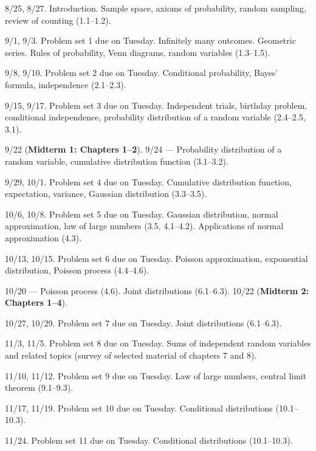 \documentclass[oneside,11pt]{amsart}
\begin{document}
\bigskip

\begin{enumerate}[\bf{}{[}week 1{]}]
	\item 8/25, 8/27. Introduction. Sample space, axioms of probability, random sampling, review of counting (1.1--1.2).
	\item 9/1, 9/3. Problem set 1 due on Tuesday.
		Infinitely many outcomes. Geometric series. 
		Rules of probability, Venn diagrams, random variables
		(1.3--1.5).
	\item 9/8, 9/10. Problem set 2 due on Tuesday.
		Conditional probability, Bayes' formula, independence
		(2.1--2.3).
	\item 9/15, 9/17. Problem set 3 due on Tuesday.
		Independent trials, birthday problem, conditional independence, 
		probability distribution of a random variable
		(2.4--2.5, 3.1).
	\item 9/22 (\textbf{Midterm 1: Chapters 1--2}). 9/24 --- 
		Probability distribution of a random variable,
		cumulative distribution function (3.1--3.2).
	\item 9/29, 10/1. Problem set 4 due on Tuesday.
		Cumulative distribution function, 
		expectation, variance, 
		Gaussian distribution
		(3.3--3.5).
	\item 10/6, 10/8. Problem set 5 due on Tuesday.
		Gaussian distribution, normal approximation,
		law of large numbers
		(3.5, 4.1--4.2).
		Applications of normal approximation (4.3).
	\item 10/13, 10/15. Problem set 6 due on Tuesday.
		Poisson approximation, exponential distribution, Poisson process
		(4.4--4.6).
	\item 10/20 --- Poisson process (4.6). 
		Joint distributions (6.1--6.3).
		10/22 (\textbf{Midterm 2: Chapters 1--4}).
	\item 10/27, 10/29.
		Problem set 7 due on Tuesday.
		Joint distributions (6.1--6.3).
	\item 11/3, 11/5. Problem set 8 due on Tuesday.
		Sums of independent random variables and related topics (survey of 
		selected material of chapters 7 and 8).
	\item 11/10, 11/12. Problem set 9 due on Tuesday.
		Law of large numbers, central limit theorem (9.1--9.3).
	\item 11/17, 11/19. Problem set 10 due on Tuesday.
		Conditional distributions (10.1--10.3).
	\item 11/24. Problem set 11 due on Tuesday.
		Conditional distributions (10.1--10.3).
\end{enumerate}
\end{document}
